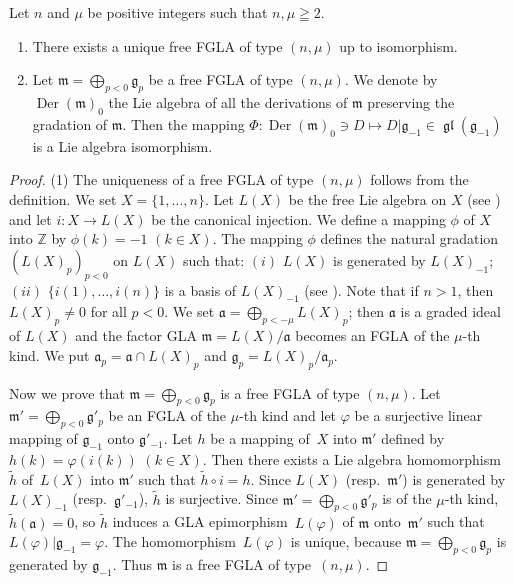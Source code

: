 \documentclass[pdftex]{sigma}
\numberwithin{equation}{section}
\numberwithin{theorem}{section}
\numberwithin{proposition}{section}
\numberwithin{lemma}{section}
\numberwithin{corollary}{section}
\numberwithin{definition}{section}
\numberwithin{example}{section}
\numberwithin{remark}{section}
\numberwithin{note}{section}
\newcommand{\gl}{\operatorname{\mathfrak{gl}}}
\newcommand{\Der}{\operatorname{Der}}
\begin{document}
\begin{proposition}\label{prop2.1} Let $n$ and $\mu$ be positive integers such that $n,\mu\geqq2$.
\begin{enumerate}\itemsep=0pt
\item There exists a unique free FGLA of type
$(n,\mu)$ up to isomorphism.
\item Let $\mathfrak m=\bigoplus\limits_{p<0}\mathfrak g_p$ be a free
FGLA of type $(n,\mu)$.
We denote by $\Der(\mathfrak m)_0$ the Lie algebra of all the derivations
of $\mathfrak m$ preserving the gradation of $\mathfrak m$.
Then the mapping $\Phi:\Der(\mathfrak m)_0\ni D\mapsto D|\mathfrak g_{-1}\in\gl(\mathfrak g_{-1})$ is a Lie algebra isomorphism.
\end{enumerate}
\end{proposition}
\begin{proof} (1)
The uniqueness of a free FGLA of type $(n,\mu)$ follows from the def\/inition.
We set $X=\{1,\dots,n\}$. Let $L(X)$ be the free Lie algebra on $X$
(see \cite[Chapter~II, \S~2]{bou72:1})
and let $i:X\to L(X)$ be the canonical injection.
We def\/ine a mapping $\phi$ of $X$ into $\mathbb Z$ by $\phi(k)=-1$ $(k\in X)$.
The mapping $\phi$ def\/ines the natural gradation $(L(X)_p)_{p<0}$
on $L(X)$ such that: $(i)$ $L(X)$ is generated by $L(X)_{-1}$;
$(ii)$ $\{i(1),\dots,i(n)\}$ is a basis of $L(X)_{-1}$
(see \cite[Chapter~II, \S~2, no.~6]{bou72:1}). Note that if $n>1$, then
$L(X)_p\ne0$ for all $p<0$.
We set $\mathfrak a=\bigoplus\limits_{p<-\mu}L(X)_p$;
then $\mathfrak a$ is a graded ideal of $L(X)$ and the factor GLA $\mathfrak m=L(X)/\mathfrak a$ becomes an FGLA of the $\mu$-th kind.
We put $\mathfrak a_p=\mathfrak a\cap L(X)_p$ and
$\mathfrak g_p=L(X)_p/\mathfrak a_p$.

Now we prove that $\mathfrak m=\bigoplus\limits_{p<0}\mathfrak g_p$ is a free
FGLA of type $(n,\mu)$.
Let $\mathfrak m'=\bigoplus\limits_{p<0}\mathfrak g'_p$ be an FGLA of the
$\mu$-th kind and let
$\varphi$ be a surjective linear mapping of $\mathfrak g_{-1}$ onto
$\mathfrak g'_{-1}$.
Let $h$ be a mapping of~$X$ into $\mathfrak m'$ def\/ined by $h(k)=\varphi(i(k))$ $(k\in X)$.
Then there exists a Lie algebra homomorphism~$\tilde{h}$ of~$L(X)$
into $\mathfrak m'$ such that $\tilde{h}\circ i=h$.
Since $L(X)$ (resp.~$\mathfrak m'$) is generated by
$L(X)_{-1}$ (resp.~$\mathfrak g'_{-1}$), $\tilde{h}$ is surjective.
Since $\mathfrak m'=\bigoplus\limits_{p<0}\mathfrak g'_p$ is of the
$\mu$-th kind, $\tilde{h}(\mathfrak a)=0$, so
$\tilde{h}$ induces a GLA epimorphism~$L(\varphi)$ of
$\mathfrak m$ onto~$\mathfrak m'$ such that
$L(\varphi)|\mathfrak g_{-1}=\varphi$.
The homomorphism~$L(\varphi)$ is unique, because
$\mathfrak m=\bigoplus\limits_{p<0}\mathfrak g_p$ is generated by
$\mathfrak g_{-1}$.
Thus $\mathfrak m$ is a free FGLA of type~$(n,\mu)$.


\end{proof}
\end{document}
